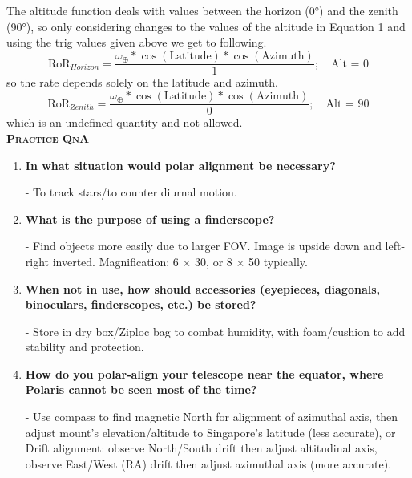 \documentclass[a4paper,12pt]{extarticle}
\begin{document}
The altitude function deals with values between
the horizon (0°) and the zenith (90°), so only considering changes to the values of the altitude in Equation 1 and using the trig values given above we get to following.
\[\text{RoR}_{Horizon}= \frac{\omega_\oplus \ast \cos(\text{Latitude}) \ast \cos(\text{Azimuth})}{1}; \quad \text{Alt = 0}\]
so the rate depends solely on the latitude and azimuth.
\[	\text{RoR}_{Zenith}= \frac{\omega_\oplus \ast \cos(\text{Latitude}) \ast \cos(\text{Azimuth})}{0}; \quad \text{Alt = 90}\]
which is an undefined quantity and not allowed.\\



\textsc{\textbf{Practice QnA}}
\begin{enumerate}
	\item \textbf{In what situation would polar alignment be necessary?}
	\begin{sol}
		- To track stars/to counter diurnal motion.
	\end{sol}
	
	\item\textbf{ What is the purpose of using a finderscope?}
	\begin{sol}
		- Find objects more easily due to larger FOV. Image is upside down and left-right inverted.
		Magnification: 6 $\times$ 30, or 8 $\times$ 50 typically.
	\end{sol}
	
	\item \textbf{When not in use, how should accessories (eyepieces, diagonals, binoculars, finderscopes, etc.) be stored?}
	\begin{sol}
		- Store in dry box/Ziploc bag to combat humidity, with foam/cushion to add stability and protection.
	\end{sol}
	
	\item \textbf{How do you polar‐align your telescope near the equator, where Polaris cannot be seen most of the time?}
	
	\begin{sol}
		- Use compass to find magnetic North for alignment of azimuthal axis, then adjust mount's elevation/altitude to Singapore’s latitude  (less accurate), or\\
		
		Drift alignment: observe North/South drift then adjust altitudinal axis, observe East/West (RA) drift then adjust azimuthal axis (more accurate).
	\end{sol}
	

\end{enumerate}
\end{document}
